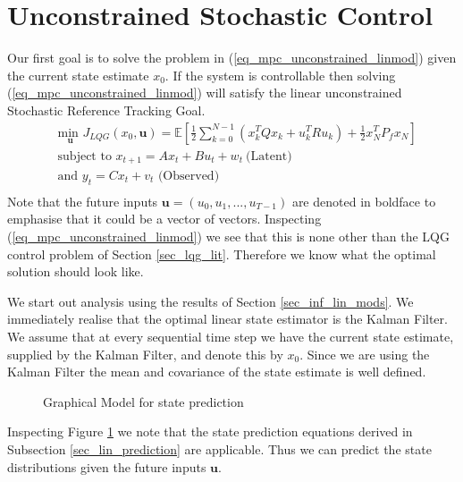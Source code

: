 \section{Unconstrained Stochastic Control}
\label{sec_uncon_lin_control}
Our first goal is to solve the problem in (\ref{eq_mpc_unconstrained_linmod}) given the current state estimate $x_0$. If the system is controllable then solving (\ref{eq_mpc_unconstrained_linmod}) will satisfy the linear unconstrained Stochastic Reference Tracking Goal.
\begin{equation}
\begin{aligned}
&\underset{\mathbf{u}}{\text{min }} J_{LQG}(x_0, \mathbf{u}) = \mathbb{E}\left[ \frac{1}{2}\sum_{k=0}^{N-1} \left( x_k^TQx_k + u_k^TRu_k \right) + \frac{1}{2}x_N^TP_fx_N \right] \\
& \text{subject to } x_{t+1}=Ax_t+Bu_t + w_t~\text{(Latent)} \\
& \text{and } y_{t}= Cx_t + v_t \text{ (Observed)}\\
\end{aligned}
\label{eq_mpc_unconstrained_linmod}
\end{equation}
Note that the future inputs $\mathbf{u}=(u_0, u_1,...,u_{T-1})$ are denoted in boldface to emphasise that it could be a vector of vectors. Inspecting (\ref{eq_mpc_unconstrained_linmod}) we see that this is none other than the LQG control problem of Section \ref{sec_lqg_lit}. Therefore we know what the optimal solution should look like.

We start out analysis using the results of Section \ref{sec_inf_lin_mods}. We immediately realise that the optimal linear state estimator is the Kalman Filter. We assume that at every sequential time step we have the current state estimate, supplied by the Kalman Filter, and denote this by $x_0$. Since we are using the Kalman Filter the mean and covariance of the state estimate is well defined. 
\begin{figure}[H] 
\centering
{}
\caption{Graphical Model for state prediction}
\label{fig_gm_mpc}
\end{figure}
Inspecting Figure \ref{fig_gm_mpc} we note that the state prediction equations derived in Subsection \ref{sec_lin_prediction} are applicable. Thus we can predict the state distributions given the future inputs $\mathbf{u}$.

